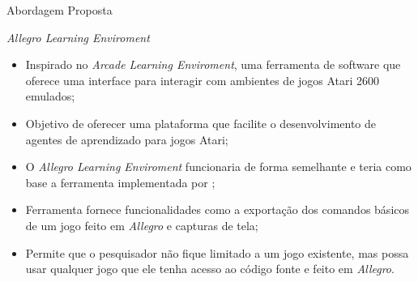 \documentclass[aspectratio=169]{beamer}
\begin{document}
\begin{frame}{Abordagem Proposta}
	\begin{block}{\textit{Allegro Learning Enviroment}}
		\begin{itemize}
			\item Inspirado no \textit{Arcade Learning Enviroment}, uma ferramenta de software que oferece uma interface para interagir com ambientes de jogos Atari 2600 emulados;

			\item Objetivo de oferecer uma plataforma que facilite o desenvolvimento de agentes de aprendizado para jogos Atari;

			\item O \textit{Allegro Learning Enviroment} funcionaria de forma semelhante e teria como base a ferramenta implementada por \cite{silva:amb-jd-allegro};

			\item Ferramenta fornece funcionalidades como a exportação dos comandos básicos de um jogo feito em \textit{Allegro} e capturas de tela;

			\item Permite que o pesquisador não fique limitado a um jogo existente, mas possa usar qualquer jogo que ele tenha acesso ao código fonte e feito em \textit{Allegro}.
		\end{itemize}
	\end{block}
\end{frame}
\end{document}
